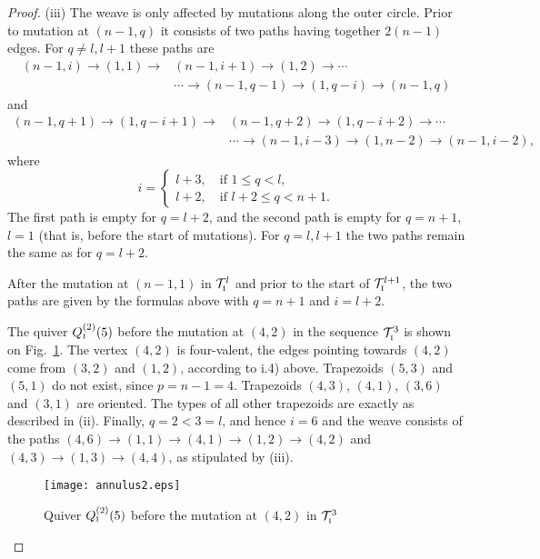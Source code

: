 \documentclass{amsart}
\theoremstyle{definition}
\theoremstyle{remark}
\numberwithin{equation}{section}
\numberwithin{theorem}{section}
\begin{document}
\begin{proof}
(iii) The weave is only affected by mutations along the outer circle. Prior to mutation at
$(n-1,q)$ it consists of two paths having together $2(n-1)$ edges. For $q\ne l, l+1$ these paths are
\begin{equation*}
\begin{split}
(n-1, i)\to (1, 1)\to &(n-1,i+1)\to (1,2)\to \cdots\\
& \cdots\to (n-1,q-1)\to (1,q-i)\to (n-1, q)
\end{split}
\end{equation*}
and 
\begin{equation*}
\begin{split}
(n-1, q+1)\to (1, q-i+1)\to &(n-1,q+2)\to (1,q-i+2)\to \cdots\\
& \cdots\to (n-1,i-3)\to (1,n-2)\to (n-1, i-2),
\end{split}
\end{equation*}
where
$$
i=\begin{cases} l+3,\quad \text{if $1\le q<l$},\\
                l+2,\quad \text{if $l+2\le q<n+1$}.
  \end{cases}
$$
The first path is empty for $q=l+2$, and the second path is empty for $q=n+1$, $l=1$ (that is, before the start
of mutations). 
For $q=l, l+1$ the two paths remain the same as for $q=l+2$.               

After the mutation at $(n-1,1)$ in ${{\mathcal T}}^{l}_{\mbox{\tiny\rm I}}$  and prior to the start of ${{\mathcal T}}^{l+1}_{\mbox{\tiny\rm I}}$, 
the two paths are given by the formulas above with $q=n+1$ and $i=l+2$.

The quiver $Q^{(2)}_{\mbox{\tiny\rm I}}(5)$ before the mutation at $(4,2)$ in the sequence ${{\mathcal T}}^3_{\mbox{\tiny\rm I}}$ is shown on Fig.~\ref{fig:ann2}.
The vertex $(4,2)$ is four-valent, the edges pointing towards $(4,2)$ come from $(3,2)$ and $(1,2)$, according
to i.4) above. 
Trapezoids $(5,3)$ and $(5,1)$ do not exist, since $p=n-1=4$. Trapezoids $(4,3)$, $(4,1)$, $(3,6)$ and $(3,1)$
are oriented. The types of all other trapezoids are exactly as described in (ii). Finally, $q=2<3=l$, and hence 
$i=6$ and the weave consists of the paths $(4,6)\to(1,1)\to(4,1)\to(1,2)\to(4,2)$ and
$(4,3)\to(1,3)\to(4,4)$, as stipulated by (iii). 

 \begin{figure}[ht]
\begin{center}
\texttt{[image: annulus2.eps]}
\caption{Quiver $Q^{(2)}_{\mbox{\tiny\rm I}}(5)$ before the mutation at $(4,2)$ in ${{\mathcal T}}^3_{\mbox{\tiny\rm I}}$}
\label{fig:ann2}
\end{center}
\end{figure}


\end{proof}
\end{document}
